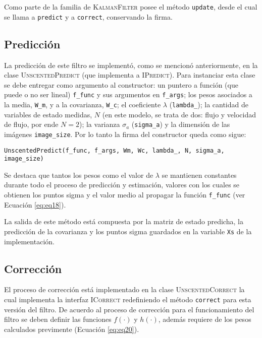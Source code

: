 Como parte de la familia de \textsc{KalmanFilter} posee el m\'etodo \texttt{update}, desde el cual se llama a \texttt{predict} y a \texttt{correct}, conservando la firma. 
 
\subsection{Predicci\'on}
La predicci\'on de este filtro se implement\'o, como se mencion\'o anteriormente, en la clase \textsc{UnscentedPredict} (que implementa a \textsc{IPredict}). Para instanciar esta clase se debe entregar como argumento al constructor: un puntero a funci\'on (que puede o no ser lineal) \texttt{f\_func} y sus argumentos en \texttt{f\_args}; los pesos asociados a la media, \texttt{W\_m}, y a la covarianza, \texttt{W\_c}; el coeficiente $\lambda$ (\texttt{lambda\_}); la cantidad de variables de estado medidas, $N$ (en este modelo, se trata de dos: flujo y velocidad de flujo, por ende $N=2$); la varianza $\sigma_a$ (\texttt{sigma\_a}) y la dimensi\'on de las im\'agenes \texttt{image\_size}. Por lo tanto la firma del constructor queda como sigue:
\bigskip
\begin{center}
\texttt{UnscentedPredict(f\_func, f\_args, Wm, Wc, lambda\_, N, sigma\_a, image\_size)}
\end{center}
\bigskip

Se destaca que tantos los pesos como el valor de $\lambda$ se mantienen constantes durante todo el proceso de predicci\'on y estimaci\'on, valores con los cuales se obtienen los puntos sigma y el valor medio al propagar la funci\'on \texttt{f\_func} (ver Ecuaci\'on \ref{eq:eq18}).
\bigskip

La salida de este m\'etodo est\'a compuesta por la matriz de estado predicha, la predicci\'on de la covarianza y los puntos sigma guardados en la variable \texttt{Xs} de la implementaci\'on.

\subsection{Correcci\'on}
El proceso de correcci\'on est\'a implementado en la clase \textsc{UnscentedCorrect} la cual implementa la interfaz \textsc{ICorrect} redefiniendo el m\'etodo \texttt{correct} para esta versi\'on del filtro. De acuerdo al proceso de correcci\'on para el funcionamiento del filtro se deben definir las funciones $f(\cdot)$ y $h(\cdot)$, adem\'as requiere de los pesos calculados previmente (Ecuaci\'on \ref{eq:eq20}).
\bigskip

